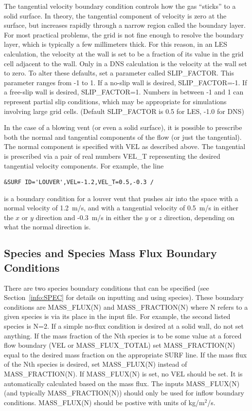 \documentclass[11pt]{book}
\begin{document}
The tangential velocity boundary condition controls how the gas
``sticks'' to a solid surface. In theory, the tangential component of
velocity is zero at the surface, but
increases rapidly through a narrow region called the boundary layer.
For most practical problems, the grid is not fine enough to resolve the
boundary layer, which is typically a few millimeters thick.
For this reason, in an LES calculation, the velocity at the wall
is set to be a fraction of its value in the grid cell adjacent to the
wall. Only in a DNS calculation is the velocity at the wall set to zero.
To alter these defaults, set a parameter called
{\ct SLIP\_FACTOR}. This parameter ranges from -1 to 1. If a no-slip wall is
desired, {\ct SLIP\_FACTOR=-1}. If a free-slip wall is desired, {\ct SLIP\_FACTOR=1}.
Numbers in between -1 and 1 can represent partial slip conditions,
which may be appropriate for simulations involving large grid cells.
(Default {\ct SLIP\_FACTOR} is 0.5 for LES, -1.0 for DNS)

In the case of a blowing vent (or even a solid surface),
it is possible to prescribe both the
normal and tangential components of the flow (or just the tangential).
The normal component is
specified with {\ct VEL} as described above. The tangential is prescribed
via a pair of real numbers {\ct VEL\_T} representing the desired tangential
velocity components. For example, the line

\footnotesize
\begin{verbatim}
&SURF ID='LOUVER',VEL=-1.2,VEL_T=0.5,-0.3 /
\end{verbatim}
\normalsize
is a boundary condition for a louver vent that pushes air into the
space with a normal velocity of 1.2~m/s, and with a tangential velocity
of 0.5~m/s in either the $x$ or $y$ direction and -0.3~m/s in either
the $y$ or $z$ direction, depending on what the normal direction is.

\subsection{Species and Species Mass Flux Boundary Conditions}

There are two species boundary conditions that can be specified
(see Section~\ref{info:SPEC} for details on inputting and using species).
These boundary conditions are {\ct MASS\_FLUX(N)} and {\ct MASS\_FRACTION(N)}
where {\ct N} refers to a given species is via its place in the
input file. For example, the second listed species is {\ct N=2}.
If a simple no-flux condition is desired at a solid wall, do not set
anything. If the mass fraction of the {\ct N}th species is to be some
value at a forced flow boundary ({\ct VEL} or {\ct MASS\_FLUX\_TOTAL}) set
{\ct MASS\_FRACTION(N)} equal to the desired mass fraction on the appropriate
{\ct SURF} line.
If the mass flux of the {\ct N}th species is desired, set
{\ct MASS\_FLUX(N)} instead of {\ct MASS\_FRACTION(N)}.
If {\ct MASS\_FLUX(N)}
is set, no {\ct VEL} should be set. It is automatically
calculated based on the mass flux.
The inputs {\ct MASS\_FLUX(N)} (and typically {\ct MASS\_FRACTION(N)}) should only be used
for inflow boundary conditions.  {\ct MASS\_FLUX(N)} should be postive with
units of kg/m$^2$/s.
\end{document}
